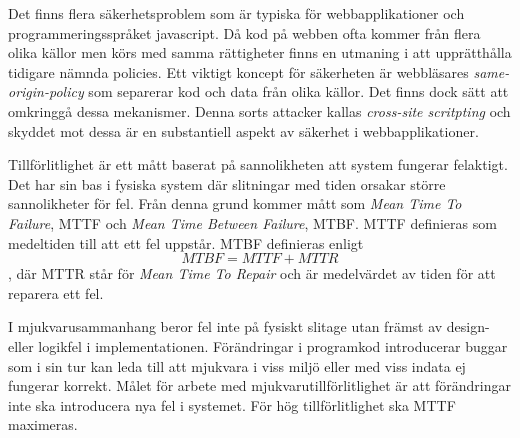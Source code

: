 Det finns flera säkerhetsproblem som är typiska för webbapplikationer och programmeringsspråket javascript. Då kod på webben ofta kommer från flera olika källor men körs med samma rättigheter finns en utmaning i att upprätthålla tidigare nämnda policies. Ett viktigt koncept för säkerheten är webbläsares \textit{same-origin-policy} som separerar kod och data från olika källor. Det finns dock sätt att omkringgå dessa mekanismer.\cite{Hejderup2017} Denna sorts attacker kallas \textit{cross-site scritpting} och skyddet mot dessa är en substantiell aspekt av säkerhet i webbapplikationer.

Tillförlitlighet är ett mått baserat på sannolikheten att system fungerar felaktigt. Det har sin bas i fysiska system där slitningar med tiden orsakar större sannolikheter för fel. Från denna grund kommer mått som \textit{Mean Time To Failure}, MTTF och \textit{Mean Time Between Failure}, MTBF. MTTF definieras som medeltiden till att ett fel uppstår. MTBF definieras enligt $$MTBF = MTTF + MTTR$$, där MTTR står för \textit{Mean Time To Repair} och är medelvärdet av tiden för att reparera ett fel.\cite{software-metrics}

I mjukvarusammanhang beror fel inte på fysiskt slitage utan främst av design- eller logikfel i implementationen. Förändringar i programkod introducerar buggar som i sin tur kan leda till att mjukvara i viss miljö eller med viss indata ej fungerar korrekt. Målet för arbete med mjukvarutillförlitlighet är att förändringar inte ska introducera nya fel i systemet.\cite{software-metrics} För hög tillförlitlighet ska MTTF maximeras.
